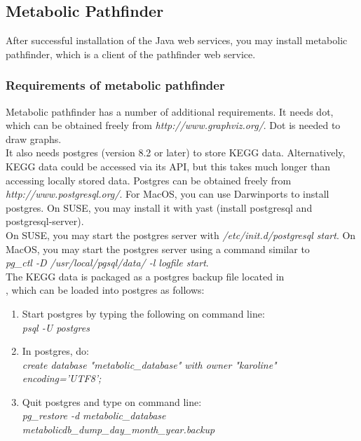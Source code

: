 \documentclass{book}
\begin{document}
\subsection{Metabolic Pathfinder}
After successful installation of the Java web services, you may install metabolic pathfinder,
which is a client of the pathfinder web service.

\subsubsection{Requirements of metabolic pathfinder}

Metabolic pathfinder has a number of additional requirements.
It needs dot, which can be obtained freely from \textit{http://www.graphviz.org/}.
Dot is needed to draw graphs.\\

It also needs postgres (version 8.2 or later) to store KEGG data.
Alternatively, KEGG data could be accessed via its API,
but this takes much longer than accessing locally stored data.
Postgres can be obtained freely from
\textit{http://www.postgresql.org/}.
For MacOS, you can use Darwinports to install postgres. On SUSE, you may
install it with yast (install postgresql and postgresql-server).\\

On SUSE, you may start the postgres server with
\textit{/etc/init.d/postgresql start}. On MacOS, you may start the postgres server
using a command similar to\\
\textit{pg\_ctl -D /usr/local/pgsql/data/ -l logfile start}.\\

The KEGG data is packaged as a postgres backup file located in\\
,
which can be loaded into postgres as follows:
\begin{enumerate}
\item Start postgres by typing the following on command line:\\
\textit{psql -U postgres}
\item In postgres, do:\\
\textit{create database "metabolic\_database" with owner "karoline" encoding='UTF8';}
\item Quit postgres and type on command line:\\
\textit{pg\_restore -d metabolic\_database metabolicdb\_dump\_day\_month\_year.backup}
\end{enumerate}
\end{document}
